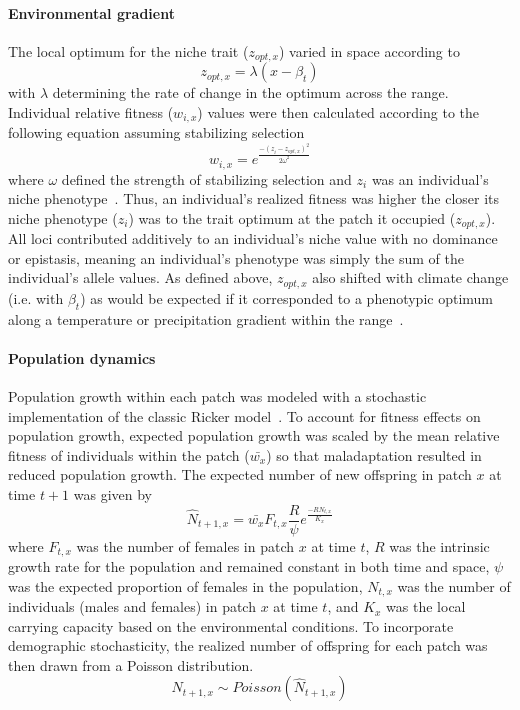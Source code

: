 \documentclass[11pt]{article}
\begin{document}
\paragraph{Environmental gradient}
The local optimum for the niche trait ($z_{opt,x}$) varied in space according to
\begin{equation}
z_{opt,x}=\lambda(x-\beta_{t})
\end{equation}
with $\lambda$ determining the rate of change in the optimum across the range. Individual relative fitness ($w_{i,x}$) values were then calculated according to the following equation assuming stabilizing selection
\begin{equation}
w_{i,x}=e^{\frac{-(z_{i}-z_{opt,x})^{2}}{2\omega^{2}}}
\end{equation}
where $\omega$ defined the strength of stabilizing selection and $z_{i}$ was an individual's niche phenotype~\citep{lande1976natural}. Thus, an individual's realized fitness was higher the closer its niche phenotype ($z_{i}$) was to the trait optimum at the patch it occupied ($z_{opt,x}$). All loci contributed additively to an individual's niche value with no dominance or epistasis, meaning an individual's phenotype was simply the sum of the individual's allele values. As defined above, $z_{opt,x}$ also shifted with climate change (i.e. with $\beta_{t}$) as would be expected if it corresponded to a phenotypic optimum along a temperature or precipitation gradient within the range~\citep{davis2001range}. 

\paragraph{Population dynamics}
Population growth within each patch was modeled with a stochastic implementation of the classic Ricker model~\citep{ricker1954stock, melbourne2008extinction}. To account for fitness effects on population growth, expected population growth was scaled by the mean relative fitness of individuals within the patch ($\bar{w_{x}}$) so that maladaptation resulted in reduced population growth. The expected number of new offspring in patch $x$ at time $t+1$ was given by
\begin{equation}
\hat{N}_{t+1,x}=\bar{w_{x}}F_{t,x}\frac{R}{\psi}e^{\frac{-RN_{t,x}}{K_{x}}}
\end{equation}
where $F_{t,x}$ was the number of females in patch $x$ at time $t$, $R$ was the intrinsic growth rate for the population and remained constant in both time and space, $\psi$ was the expected proportion of females in the population, $N_{t,x}$ was the number of individuals (males and females) in patch $x$ at time $t$, and $K_{x}$ was the local carrying capacity based on the environmental conditions. To incorporate demographic stochasticity, the realized number of offspring for each patch was then drawn from a Poisson distribution.
\begin{equation}
N_{t+1,x}\sim Poisson(\hat{N}_{t+1,x})
\end{equation}
\end{document}
